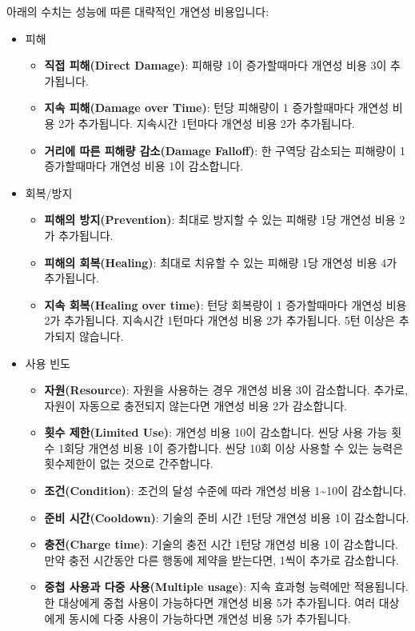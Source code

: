 \documentclass[12pt]{report}
\begin{document}
	아래의 수치는 성능에 따른 대략적인 개연성 비용입니다:
	\begin{itemize}
		\item 피해
		\begin{itemize}
			\item \textbf{직접 피해(Direct Damage)}: 피해량 1이 증가할때마다 개연성 비용 3이 추가됩니다.
			\item \textbf{지속 피해(Damage over Time)}: 턴당 피해량이 1 증가할때마다 개연성 비용 2가 추가됩니다. 지속시간 1턴마다 개연성 비용 2가 추가됩니다.
			\item \textbf{거리에 따른 피해량 감소(Damage Falloff)}: 한 구역당 감소되는 피해량이 1 증가할때마다 개연성 비용 1이 감소합니다.
		\end{itemize}
		
		\item 회복/방지
		\begin{itemize}
			\item \textbf{피해의 방지(Prevention)}: 최대로 방지할 수 있는 피해량 1당 개연성 비용 2가 추가됩니다.
			\item \textbf{피해의 회복(Healing)}: 최대로 치유할 수 있는 피해량 1당 개연성 비용 4가 추가됩니다.
			\item \textbf{지속 회복(Healing over time)}: 턴당 회복량이 1 증가할때마다 개연성 비용 2가 추가됩니다. 지속시간 1턴마다 개연성 비용 2가 추가됩니다. 5턴 이상은 추가되지 않습니다.
		\end{itemize}
		
		\item 사용 빈도
		\begin{itemize}
			\item \textbf{자원(Resource)}: 자원을 사용하는 경우 개연성 비용 3이 감소합니다. 추가로, 자원이 자동으로 충전되지 않는다면 개연성 비용 2가 감소합니다.
			\item \textbf{횟수 제한(Limited Use)}: 개연성 비용 10이 감소합니다. 씬당 사용 가능 횟수 1회당 개연성 비용 1이 증가합니다. 씬당 10회 이상 사용할 수 있는 능력은 횟수제한이 없는 것으로 간주합니다.
			\item \textbf{조건(Condition)}: 조건의 달성 수준에 따라 개연성 비용 1\textasciitilde10이 감소합니다.
			\item \textbf{준비 시간(Cooldown)}: 기술의 준비 시간 1턴당 개연성 비용 1이 감소합니다.
			\item \textbf{충전(Charge time)}: 기술의 충전 시간 1턴당 개연성 비용 1이 감소합니다. 만약 충전 시간동안 다른 행동에 제약을 받는다면, 1씩이 추가로 감소합니다.
			\item \textbf{중첩 사용과 다중 사용(Multiple usage)}: 지속 효과형 능력에만 적용됩니다. 한 대상에게 중첩 사용이 가능하다면 개연성 비용 5가 추가됩니다. 여러 대상에게 동시에 다중 사용이 가능하다면 개연성 비용 5가 추가됩니다.
		\end{itemize}
		

\end{itemize}
\end{document}
